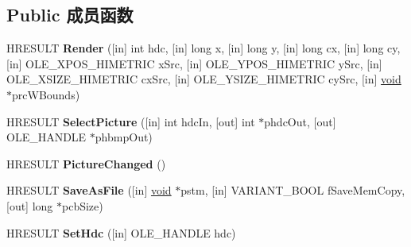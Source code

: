 \subsection*{Public 成员函数}
\begin{DoxyCompactItemize}
\item 
\mbox{\label{interface_std_type_1_1_i_picture_a5b50b96554d626c4564555bffbeb26aa}} 
H\+R\+E\+S\+U\+LT {\bfseries Render} (\mbox{[}in\mbox{]} int hdc, \mbox{[}in\mbox{]} long x, \mbox{[}in\mbox{]} long y, \mbox{[}in\mbox{]} long cx, \mbox{[}in\mbox{]} long cy, \mbox{[}in\mbox{]} O\+L\+E\+\_\+\+X\+P\+O\+S\+\_\+\+H\+I\+M\+E\+T\+R\+IC x\+Src, \mbox{[}in\mbox{]} O\+L\+E\+\_\+\+Y\+P\+O\+S\+\_\+\+H\+I\+M\+E\+T\+R\+IC y\+Src, \mbox{[}in\mbox{]} O\+L\+E\+\_\+\+X\+S\+I\+Z\+E\+\_\+\+H\+I\+M\+E\+T\+R\+IC cx\+Src, \mbox{[}in\mbox{]} O\+L\+E\+\_\+\+Y\+S\+I\+Z\+E\+\_\+\+H\+I\+M\+E\+T\+R\+IC cy\+Src, \mbox{[}in\mbox{]} \hyperlink{interfacevoid}{void} $\ast$prc\+W\+Bounds)
\item 
\mbox{\label{interface_std_type_1_1_i_picture_a39bad32b869def27e701ad949ba6e223}} 
H\+R\+E\+S\+U\+LT {\bfseries Select\+Picture} (\mbox{[}in\mbox{]} int hdc\+In, \mbox{[}out\mbox{]} int $\ast$phdc\+Out, \mbox{[}out\mbox{]} O\+L\+E\+\_\+\+H\+A\+N\+D\+LE $\ast$phbmp\+Out)
\item 
\mbox{\label{interface_std_type_1_1_i_picture_a54ffc62d9536547965044f3877a10bdf}} 
H\+R\+E\+S\+U\+LT {\bfseries Picture\+Changed} ()
\item 
\mbox{\label{interface_std_type_1_1_i_picture_a3e077b075eb14e20e17da10f76374b4a}} 
H\+R\+E\+S\+U\+LT {\bfseries Save\+As\+File} (\mbox{[}in\mbox{]} \hyperlink{interfacevoid}{void} $\ast$pstm, \mbox{[}in\mbox{]} V\+A\+R\+I\+A\+N\+T\+\_\+\+B\+O\+OL f\+Save\+Mem\+Copy, \mbox{[}out\mbox{]} long $\ast$pcb\+Size)
\item 
\mbox{\label{interface_std_type_1_1_i_picture_ad0c890ed3251831c4ddbb4bfba80c680}} 
H\+R\+E\+S\+U\+LT {\bfseries Set\+Hdc} (\mbox{[}in\mbox{]} O\+L\+E\+\_\+\+H\+A\+N\+D\+LE hdc)
\end{DoxyCompactItemize}
